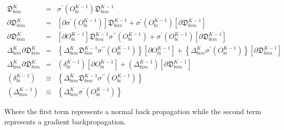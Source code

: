 \begin{eqnarray*}
    \mathfrak{D}_{bim}^{K} & = & \sigma^{\prime}\left(O_{bi}^{K-1}\right)\mathfrak{D}_{bim}^{K-1}\\
    \partial\mathfrak{D}_{bim}^{K} & = & \left[\partial\sigma^{\prime}\left(O_{bi}^{K-1}\right)\right]\mathfrak{D}_{bim}^{K-1}+\sigma^{\prime}\left(O_{bi}^{K-1}\right)\left[\partial\mathfrak{D}_{bim}^{K-1}\right]\\
    \partial\mathfrak{D}_{bim}^{K} & = & \left[\partial O_{bi}^{K-1}\right]\mathfrak{D}_{bim}^{K-1}\sigma^{\prime\prime}\left(O_{bi}^{K-1}\right)+\sigma^{\prime}\left(O_{bi}^{K-1}\right)\left[\partial\mathfrak{D}_{bim}^{K-1}\right]\\
    \Delta_{bim}^{K}\partial\mathfrak{D}_{bim}^{K} & = & \left\{ \Delta_{bim}^{K}\mathfrak{D}_{bim}^{K-1}\sigma^{\prime\prime}\left(O_{bi}^{K-1}\right)\right\} \left[\partial O_{bi}^{K-1}\right]+\left\{ \Delta_{bim}^{K}\sigma^{\prime}\left(O_{bi}^{K-1}\right)\right\} \left[\partial\mathfrak{D}_{bim}^{K-1}\right]\\
    \Delta_{bim}^{K}\partial\mathfrak{D}_{bim}^{K} & = & \left(\delta_{bi}^{K-1}\right)\left[\partial O_{bi}^{K-1}\right]+\left(\Delta_{bim}^{K-1}\right)\left[\partial\mathfrak{D}_{bim}^{K-1}\right]\\
    \left(\delta_{bi}^{K-1}\right) & \equiv & \left\{ \Delta_{bim}^{K}\mathfrak{D}_{bim}^{K-1}\sigma^{\prime\prime}\left(O_{bi}^{K-1}\right)\right\} \\
    \left(\Delta_{bim}^{K-1}\right) & \equiv & \left\{ \Delta_{bim}^{K}\sigma^{\prime}\left(O_{bi}^{K-1}\right)\right\} 
\end{eqnarray*}

Where the first term represents a normal back propagation while the
second term represents a gradient backpropagation.